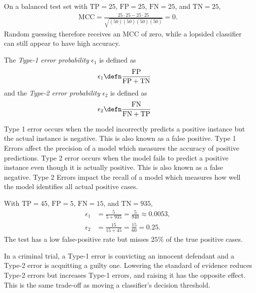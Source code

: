 \documentclass[a4paper, 12pt]{book}
\begin{document}
\begin{example}
    On a balanced test set with $\mathrm{TP}=25$, $\mathrm{FP}=25$,
    $\mathrm{FN}=25$, and $\mathrm{TN}=25$,
    \begin{align}
        \mathrm{MCC}
        = \frac{25\cdot25 - 25\cdot25}
               {\sqrt{(50)(50)(50)(50)}} = 0.
    \end{align}
    Random guessing therefore receives an MCC of zero, while a lopsided
    classifier can still appear to have high accuracy.
\end{example}

\begin{definition}
    The \emph{Type-1 error probability} $\epsilon_1$ is defined as
    \begin{align}
        \epsilon_1 &\defn \frac{\mathrm{FP}}{\mathrm{FP} + \mathrm{TN}}
    \end{align}
    and the \emph{Type-2 error probability} $\epsilon_2$ is defined as
    \begin{align}
        \epsilon_2 &\defn \frac{\mathrm{FN}}{\mathrm{FN} + \mathrm{TP}}
    \end{align}
\end{definition}
Type 1 error occurs when the model incorrectly predicts a positive instance but the actual instance is negative. This is also known as a false positive. Type 1 Errors affect the precision of a model which measures the accuracy of positive predictions. Type 2 error occurs when the model fails to predict a positive instance even though it is actually positive. This is also known as a false negative. Type 2 Errors impact the recall of a model which measures how well the model identifies all actual positive cases.
\begin{example}
    With $\mathrm{TP}=45$, $\mathrm{FP}=5$, $\mathrm{FN}=15$, and
    $\mathrm{TN}=935$,
    \begin{align}
        \epsilon_1 &= \frac{5}{5+935} = \frac{5}{940} \approx 0.0053, \\
        \epsilon_2 &= \frac{15}{15+45} = \frac{15}{60} = 0.25.
    \end{align}
    The test has a low false-positive rate but misses $25\%$ of the true
    positive cases.
\end{example}

\begin{example}
    In a criminal trial, a Type-1 error is convicting an innocent defendant and
    a Type-2 error is acquitting a guilty one. Lowering the standard of evidence
    reduces Type-2 errors but increases Type-1 errors, and raising it has the
    opposite effect. This is the same trade-off as moving a classifier's decision
    threshold.
\end{example}
\end{document}
